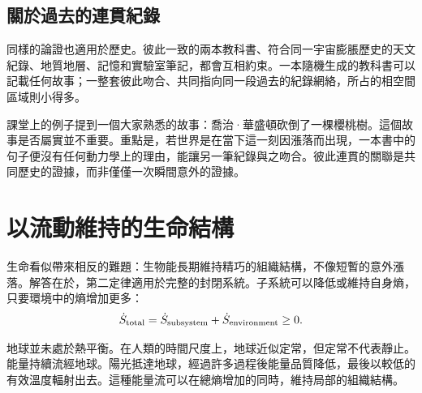 \subsection{關於過去的連貫紀錄}

同樣的論證也適用於歷史。彼此一致的兩本教科書、符合同一宇宙膨脹歷史的天文紀錄、地質地層、記憶和實驗室筆記，都會互相約束。一本隨機生成的教科書可以記載任何故事；一整套彼此吻合、共同指向同一段過去的紀錄網絡，所占的相空間區域則小得多。

課堂上的例子提到一個大家熟悉的故事：喬治·華盛頓砍倒了一棵櫻桃樹。這個故事是否屬實並不重要。重點是，若世界是在當下這一刻因漲落而出現，一本書中的句子便沒有任何動力學上的理由，能讓另一筆紀錄與之吻合。彼此連貫的關聯是共同歷史的證據，而非僅僅一次瞬間意外的證據。

\begin{classroomqa}
\end{classroomqa}

\begin{classroomqa}
\end{classroomqa}

\section{以流動維持的生命結構}

生命看似帶來相反的難題：生物能長期維持精巧的組織結構，不像短暫的意外漲落。解答在於，第二定律適用於完整的封閉系統。子系統可以降低或維持自身熵，只要環境中的熵增加更多：
\begin{equation}
 \dot S_{\rm total}
 =\dot S_{\rm subsystem}+\dot S_{\rm environment}\geq 0.
 \label{eq:sm8-open-system-second-law}
\end{equation}

地球並未處於熱平衡。在人類的時間尺度上，地球近似定常，但定常不代表靜止。能量持續流經地球。陽光抵達地球，經過許多過程後能量品質降低，最後以較低的有效溫度輻射出去。這種能量流可以在總熵增加的同時，維持局部的組織結構。

